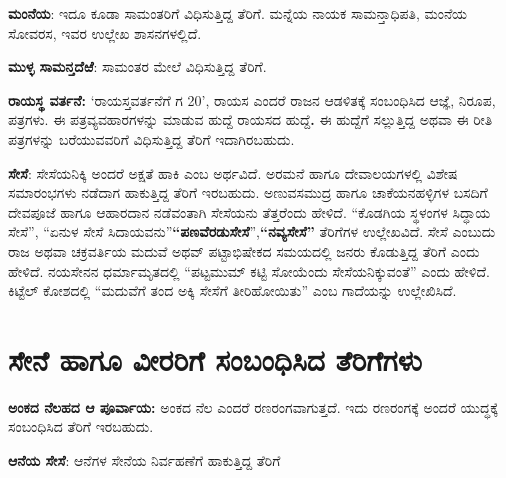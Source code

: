 \textbf{ಮಂನೆಯ}: ಇದೂ ಕೂಡಾ ಸಾಮಂತರಿಗೆ ವಿಧಿಸುತ್ತಿದ್ದ ತೆರಿಗೆ. ಮನ್ನೆಯ ನಾಯಕ ಸಾಮನ್ತಾಧಿಪತಿ, ಮಂನೆಯ ಸೋವರಸ, ಇವರ ಉಲ್ಲೇಖ ಶಾಸನಗಳಲ್ಲಿದೆ.

\textbf{ಮುಳ್ಳ ಸಾಮನ್ತದೆಱೆ}: ಸಾಮಂತರ ಮೇಲೆ ವಿಧಿಸುತ್ತಿದ್ದ ತೆರಿಗೆ.

\textbf{ರಾಯಸ್ಥ ವರ್ತನೆ: } ‘ರಾಯಸ್ತವರ್ತನೆಗೆ ಗ 20’, ರಾಯಸ ಎಂದರೆ ರಾಜನ ಆಡಳಿತಕ್ಕೆ ಸಂಬಂಧಿಸಿದ ಆಜ್ಞೆ, ನಿರೂಪ, ಪತ್ರಗಳು. ಈ ಪತ್ರವ್ಯವಹಾರಗಳನ್ನು ಮಾಡುವ ಹುದ್ದೆ ರಾಯಸದ ಹುದ್ದೆ\textbf{. } ಈ ಹುದ್ದೆಗೆ ಸಲ್ಲುತ್ತಿದ್ದ ಅಥವಾ ಈ ರೀತಿ ಪತ್ರಗಳನ್ನು ಬರೆಯುವವರಿಗೆ ವಿಧಿಸುತ್ತಿದ್ದ ತೆರಿಗೆ ಇದಾಗಿರಬಹುದು.

\textbf{ಸೇಸೆ}: ಸೇಸೆಯನಿಕ್ಕಿ ಅಂದರೆ ಅಕ್ಷತೆ ಹಾಕಿ ಎಂಬ ಅರ್ಥವಿದೆ.\textbf{ }ಅರಮನೆ ಹಾಗೂ ದೇವಾಲಯಗಳಲ್ಲಿ ವಿಶೇಷ ಸಮಾರಂಭಗಳು ನಡೆದಾಗ ಹಾಕುತ್ತಿದ್ದ ತೆರಿಗೆ ಇರಬಹುದು. ಅಣುವಸಮುದ್ರ ಹಾಗೂ ಚಾಕೆಯನಹಳ್ಳಿಗಳ ಬಸದಿಗೆ ದೇವಪೂಜೆ ಹಾಗೂ ಆಹಾರದಾನ ನಡೆವಂತಾಗಿ ಸೇಸೆಯನು ತೆತ್ತರೆಂದು ಹೇಳಿದೆ. “ಕೊಡಗಿಯ ಸ್ಥಳಂಗಳ ಸಿದ್ಧಾಯ ಸೇಸೆ”, “ಏನುಳ ಸೇಸೆ ಸಿದಾಯವನು”\textbf{“ಪಣವೆರಡುಸೇಸೆ}”,\textbf{“ನವ್ಯಸೇಸೆ”} ತೆರಿಗೆಗಳ ಉಲ್ಲೇಖವಿದೆ. ಸೇಸೆ ಎಂಬುದು ರಾಜ ಅಥವಾ ಚಕ್ರವರ್ತಿಯ ಮದುವೆ ಅಥವ್ ಪಟ್ಟಾಭಿಷೇಕದ ಸಮಯದಲ್ಲಿ ಜನರು ಕೊಡುತ್ತಿದ್ದ ತೆರಿಗೆ ಎಂದು ಹೇಳಿದೆ. ನಯಸೇನನ ಧರ್ಮಾಮೃತದಲ್ಲಿ “ಪಟ್ಟಮುಮ್ ಕಟ್ಟಿ ಸೋಯೆಂದು ಸೇಸೆಯನಿಕ್ಕುವಂತೆ” ಎಂದು ಹೇಳಿದೆ. ಕಿಟ್ಟೆಲ್​ ಕೋಶದಲ್ಲಿ “ಮದುವೆಗೆ ತಂದ ಅಕ್ಕಿ ಸೇಸೆಗೆ ತೀರಿಹೋಯಿತು” ಎಂಬ ಗಾದೆಯನ್ನು ಉಲ್ಲೇಖಿಸಿದೆ.


\section{ಸೇನೆ ಹಾಗೂ ವೀರರಿಗೆ ಸಂಬಂಧಿಸಿದ ತೆರಿಗೆಗಳು}

\textbf{ಅಂಕದ ನೆಲಹದ ಆ ಪೂರ್ವಾಯ:} ಅಂಕದ ನೆಲ ಎಂದರೆ ರಣರಂಗವಾಗುತ್ತದೆ. ಇದು ರಣರಂಗಕ್ಕೆ ಅಂದರೆ ಯುದ್ಧಕ್ಕೆ ಸಂಬಂಧಿಸಿದ ತೆರಿಗೆ ಇರಬಹುದು.

\textbf{ಆನೆಯ ಸೇಸೆ}: ಆನೆಗಳ ಸೇನೆಯ ನಿರ್ವಹಣೆಗೆ ಹಾಕುತ್ತಿದ್ದ ತೆರಿಗೆ

